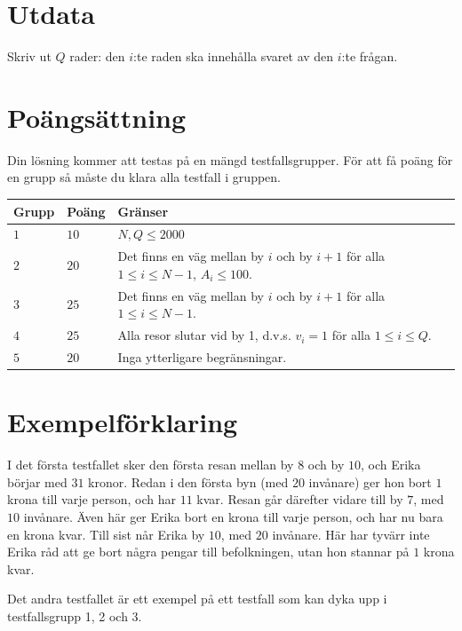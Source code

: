 \section*{Utdata}
Skriv ut $Q$ rader: den $i$:te raden ska innehålla svaret av den $i$:te frågan.

\section*{Poängsättning}
Din lösning kommer att testas på en mängd testfallsgrupper.
För att få poäng för en grupp så måste du klara alla testfall i gruppen.

\noindent
\begin{tabular}{| l | l | p{12cm} |}
  \hline
  \textbf{Grupp} & \textbf{Poäng} & \textbf{Gränser} \\ \hline
  $1$   & $10$       & $N,Q \leq 2000$\\ \hline
  $2$   & $20$       & Det finns en väg mellan by $i$ och by $i+1$ för alla $1 \leq i \leq N-1$, $A_i \leq 100$. \\ \hline
  $3$   & $25$       & Det finns en väg mellan by $i$ och by $i+1$ för alla $1 \leq i \leq N-1$. \\ \hline
  $4$   & $25$       & Alla resor slutar vid by 1, d.v.s. $v_i=1$ för alla $1 \leq i \leq Q$. \\ \hline
  $5$   & $20$       & Inga ytterligare begränsningar. \\ \hline
\end{tabular}

\section*{Exempelförklaring}
I det första testfallet sker den första resan mellan by $8$ och by $10$, och Erika börjar med $31$ kronor.
Redan i den första byn (med $20$ invånare) ger hon bort $1$ krona till varje person, och har $11$ kvar.
Resan går därefter vidare till by $7$, med $10$ invånare. Även här ger Erika bort en krona till varje person, och har nu bara en krona kvar.
Till sist når Erika by $10$, med $20$ invånare. Här har tyvärr inte Erika råd att ge bort några pengar till befolkningen, utan hon stannar på $1$ krona kvar.

Det andra testfallet är ett exempel på ett testfall som kan dyka upp i testfallsgrupp 1, 2 och 3.
